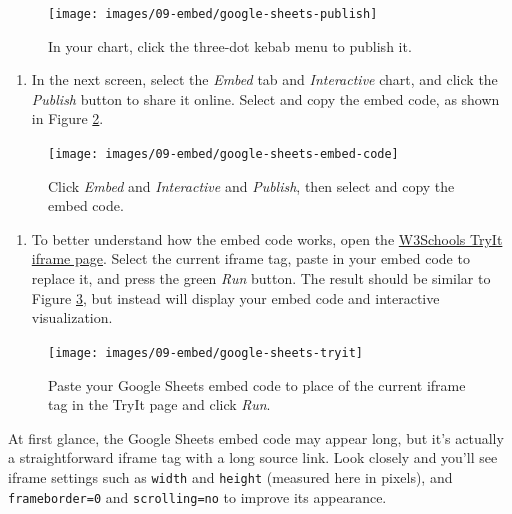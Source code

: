 \documentclass[
  english,
]{book}
\providecommand{\tightlist}{%
  \setlength{\itemsep}{0pt}\setlength{\parskip}{0pt}}
\begin{document}
\begin{figure}
\texttt{[image: images/09-embed/google-sheets-publish]} \caption{In your chart, click the three-dot kebab menu to publish it.}\label{fig:google-sheets-publish}
\end{figure}

\begin{enumerate}
\def\labelenumi{\arabic{enumi}.}
\setcounter{enumi}{1}
\tightlist
\item
  In the next screen, select the \emph{Embed} tab and \emph{Interactive} chart, and click the \emph{Publish} button to share it online. Select and copy the embed code, as shown in Figure \ref{fig:google-sheets-embed-code}.
\end{enumerate}



\begin{figure}
\texttt{[image: images/09-embed/google-sheets-embed-code]} \caption{Click \emph{Embed} and \emph{Interactive} and \emph{Publish}, then select and copy the embed code.}\label{fig:google-sheets-embed-code}
\end{figure}

\begin{enumerate}
\def\labelenumi{\arabic{enumi}.}
\setcounter{enumi}{2}
\tightlist
\item
  To better understand how the embed code works, open the \href{https://www.w3schools.com/tags/tryit.asp?filename=tryhtml_iframe}{W3Schools TryIt iframe page}. Select the current iframe tag, paste in your embed code to replace it, and press the green \emph{Run} button. The result should be similar to Figure \ref{fig:google-sheets-tryit}, but instead will display your embed code and interactive visualization.
\end{enumerate}



\begin{figure}
\texttt{[image: images/09-embed/google-sheets-tryit]} \caption{Paste your Google Sheets embed code to place of the current iframe tag in the TryIt page and click \emph{Run}.}\label{fig:google-sheets-tryit}
\end{figure}

At first glance, the Google Sheets embed code may appear long, but it's actually a straightforward iframe tag with a long source link. Look closely and you'll see iframe settings such as \texttt{width} and \texttt{height} (measured here in pixels), and \texttt{frameborder=\textquotesingle{}0\textquotesingle{}} and \texttt{scrolling=\textquotesingle{}no\textquotesingle{}} to improve its appearance.
\end{document}
